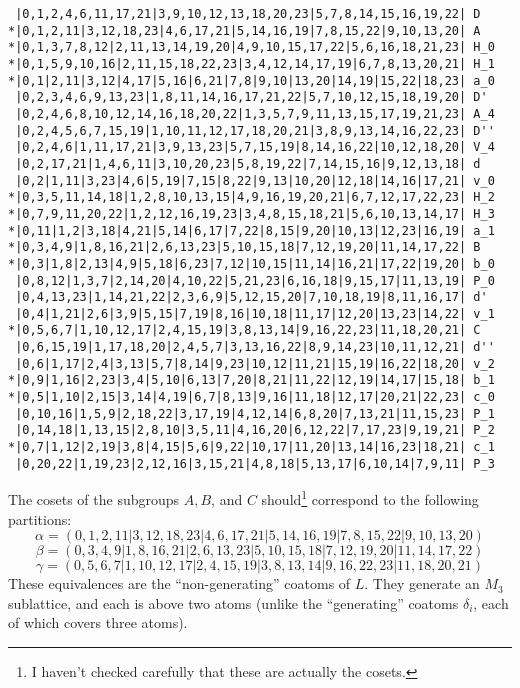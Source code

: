 {\small
\begin{verbatim}
 |0,1,2,4,6,11,17,21|3,9,10,12,13,18,20,23|5,7,8,14,15,16,19,22| D
*|0,1,2,11|3,12,18,23|4,6,17,21|5,14,16,19|7,8,15,22|9,10,13,20| A
*|0,1,3,7,8,12|2,11,13,14,19,20|4,9,10,15,17,22|5,6,16,18,21,23| H_0
*|0,1,5,9,10,16|2,11,15,18,22,23|3,4,12,14,17,19|6,7,8,13,20,21| H_1
*|0,1|2,11|3,12|4,17|5,16|6,21|7,8|9,10|13,20|14,19|15,22|18,23| a_0
 |0,2,3,4,6,9,13,23|1,8,11,14,16,17,21,22|5,7,10,12,15,18,19,20| D'
 |0,2,4,6,8,10,12,14,16,18,20,22|1,3,5,7,9,11,13,15,17,19,21,23| A_4
 |0,2,4,5,6,7,15,19|1,10,11,12,17,18,20,21|3,8,9,13,14,16,22,23| D''
 |0,2,4,6|1,11,17,21|3,9,13,23|5,7,15,19|8,14,16,22|10,12,18,20| V_4
 |0,2,17,21|1,4,6,11|3,10,20,23|5,8,19,22|7,14,15,16|9,12,13,18| d
 |0,2|1,11|3,23|4,6|5,19|7,15|8,22|9,13|10,20|12,18|14,16|17,21| v_0
*|0,3,5,11,14,18|1,2,8,10,13,15|4,9,16,19,20,21|6,7,12,17,22,23| H_2
*|0,7,9,11,20,22|1,2,12,16,19,23|3,4,8,15,18,21|5,6,10,13,14,17| H_3
*|0,11|1,2|3,18|4,21|5,14|6,17|7,22|8,15|9,20|10,13|12,23|16,19| a_1
*|0,3,4,9|1,8,16,21|2,6,13,23|5,10,15,18|7,12,19,20|11,14,17,22| B
*|0,3|1,8|2,13|4,9|5,18|6,23|7,12|10,15|11,14|16,21|17,22|19,20| b_0
 |0,8,12|1,3,7|2,14,20|4,10,22|5,21,23|6,16,18|9,15,17|11,13,19| P_0
 |0,4,13,23|1,14,21,22|2,3,6,9|5,12,15,20|7,10,18,19|8,11,16,17| d'
 |0,4|1,21|2,6|3,9|5,15|7,19|8,16|10,18|11,17|12,20|13,23|14,22| v_1
*|0,5,6,7|1,10,12,17|2,4,15,19|3,8,13,14|9,16,22,23|11,18,20,21| C
 |0,6,15,19|1,17,18,20|2,4,5,7|3,13,16,22|8,9,14,23|10,11,12,21| d''
 |0,6|1,17|2,4|3,13|5,7|8,14|9,23|10,12|11,21|15,19|16,22|18,20| v_2
*|0,9|1,16|2,23|3,4|5,10|6,13|7,20|8,21|11,22|12,19|14,17|15,18| b_1
*|0,5|1,10|2,15|3,14|4,19|6,7|8,13|9,16|11,18|12,17|20,21|22,23| c_0
 |0,10,16|1,5,9|2,18,22|3,17,19|4,12,14|6,8,20|7,13,21|11,15,23| P_1
 |0,14,18|1,13,15|2,8,10|3,5,11|4,16,20|6,12,22|7,17,23|9,19,21| P_2
*|0,7|1,12|2,19|3,8|4,15|5,6|9,22|10,17|11,20|13,14|16,23|18,21| c_1
 |0,20,22|1,19,23|2,12,16|3,15,21|4,8,18|5,13,17|6,10,14|7,9,11| P_3
\end{verbatim}
}
\newpage
The cosets of the subgroups $A, B$, and $C$ should\footnote{I haven't checked carefully that these are actually the cosets.}
correspond to the following partitions:
\[
\alpha = (0,1,2,11|3,12,18,23|4,6,17,21|5,14,16,19|7,8,15,22|9,10,13,20)
\]
\[
\beta = (0,3,4,9|1,8,16,21|2,6,13,23|5,10,15,18|7,12,19,20|11,14,17,22)
\]
\[
\gamma = (0,5,6,7|1,10,12,17|2,4,15,19|3,8,13,14|9,16,22,23|11,18,20,21)
\]
These equivalences are the ``non-generating'' coatoms of $L$.  
They generate an $M_3$ sublattice, and each is above two atoms 
(unlike the ``generating'' coatoms $\delta_i$, each of which covers three atoms).  
